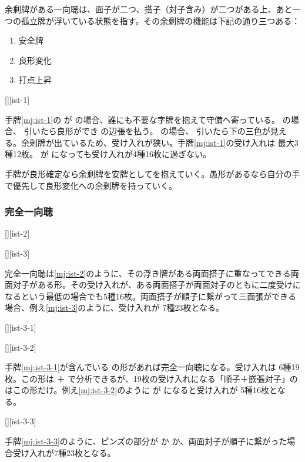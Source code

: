 \documentclass[10pt, twocolumn]{article}
\begin{document}
余剰牌がある一向聴は、面子が二つ、搭子（対子含み）が二つがある上、あと一つの孤立牌が浮いている状態を指す。その余剰牌の機能は下記の通り三つある：

\begin{enumerate}
  \item 安全牌
  \item 良形変化
  \item 打点上昇
\end{enumerate}

[][ist-1]

手牌\ref{mj:ist-1}の  が  の場合、誰にも不要な字牌を抱えて守備へ寄っている。 の場合、 引いたら良形ができ  の辺張を払う。 の場合、 引いたら下の三色が見える。余剰牌が出ているため、受け入れが狭い。手牌\ref{mj:ist-1}の受け入れは  最大3種12枚。 が  になっても受け入れが4種16枚に過ぎない。

手牌が良形確定なら余剰牌を安牌としてを抱えていく。愚形があるなら自分の手で優先して良形変化への余剰牌を持っていく。

\subsubsection*{完全一向聴} 

[][ist-2]

[][ist-3]

完全一向聴は\ref{mj:ist-2}のように、その浮き牌がある両面搭子に重なってできる両面対子がある形。その受け入れが、ある両面搭子が両面対子のともに二度受けになるという最低の場合でも5種16枚。両面搭子が順子に繋がって三面張ができる場合、例え\ref{mj:ist-3}のように、受け入れが  7種23枚となる。

[][ist-3-1]

[][ist-3-2]

手牌\ref{mj:ist-3-1}が含んでいる  の形があれば完全一向聴になる。受け入れは  6種19枚。この形は ＋ で分析できるが、19枚の受け入れになる「順子＋嵌張対子」のはこの形だけ。例え\ref{mj:ist-3-2}のように  が  になると受け入れが  5種16枚となる。

[][ist-3-3]

手牌\ref{mj:ist-3-3}のように、ピンズの部分が  か  か、両面対子が順子に繋がった場合受け入れが7種23枚となる。
\end{document}
